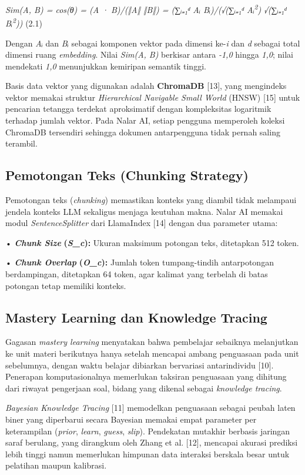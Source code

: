 \documentclass[12pt,a4paper]{article}
\begin{document}
\textit{Sim(A, B) = cos(θ) = (A · B)/(‖A‖ ‖B‖) = (∑ᵢ₌₁ᵈ Aᵢ Bᵢ)/(√(∑ᵢ₌₁ᵈ Aᵢ\textsuperscript{2}) √(∑ᵢ₌₁ᵈ Bᵢ\textsuperscript{2}))}	(2.1)

Dengan \textit{Aᵢ} dan \textit{Bᵢ} sebagai komponen vektor pada dimensi ke-\textit{i} dan \textit{d} sebagai total dimensi ruang \textit{embedding}. Nilai \textit{Sim(A, B)} berkisar antara \textit{-1,0} hingga \textit{1,0}; nilai mendekati \textit{1,0} menunjukkan kemiripan semantik tinggi.

Basis data vektor yang digunakan adalah \textbf{ChromaDB} {[}13{]}, yang mengindeks vektor memakai struktur \textit{Hierarchical Navigable Small World} (HNSW) {[}15{]} untuk pencarian tetangga terdekat aproksimatif dengan kompleksitas logaritmik terhadap jumlah vektor. Pada Nalar AI, setiap pengguna memperoleh koleksi ChromaDB tersendiri sehingga dokumen antarpengguna tidak pernah saling terambil.

\subsection*{Pemotongan Teks (Chunking Strategy)}
Pemotongan teks (\textit{chunking}) memastikan konteks yang diambil tidak melampaui jendela konteks LLM sekaligus menjaga keutuhan makna. Nalar AI memakai modul \textit{SentenceSplitter} dari LlamaIndex {[}14{]} dengan dua parameter utama:

•  \textbf{\textit{Chunk Size}} \textbf{(}\textbf{\textit{S\_c}\textbf{}):} Ukuran maksimum potongan teks, ditetapkan 512 token.

•  \textbf{\textit{Chunk Overlap}} \textbf{(}\textbf{\textit{O\_c}\textbf{}):} Jumlah token tumpang-tindih antarpotongan berdampingan, ditetapkan 64 token, agar kalimat yang terbelah di batas potongan tetap memiliki konteks.

\subsection*{Mastery Learning dan Knowledge Tracing}
Gagasan \textit{mastery learning} menyatakan bahwa pembelajar sebaiknya melanjutkan ke unit materi berikutnya hanya setelah mencapai ambang penguasaan pada unit sebelumnya, dengan waktu belajar dibiarkan bervariasi antarindividu {[}10{]}. Penerapan komputasionalnya memerlukan taksiran penguasaan yang dihitung dari riwayat pengerjaan soal, bidang yang dikenal sebagai \textit{knowledge tracing}.

\textit{Bayesian Knowledge Tracing} {[}11{]} memodelkan penguasaan sebagai peubah laten biner yang diperbarui secara Bayesian memakai empat parameter per keterampilan (\textit{prior}, \textit{learn}, \textit{guess}, \textit{slip}). Pendekatan mutakhir berbasis jaringan saraf berulang, yang dirangkum oleh Zhang et al. {[}12{]}, mencapai akurasi prediksi lebih tinggi namun memerlukan himpunan data interaksi berskala besar untuk pelatihan maupun kalibrasi.
\end{document}
